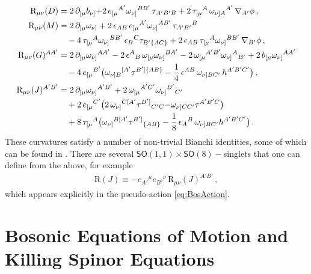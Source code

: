 \documentclass[a4paper,10pt,openany]{article}
\def\rmR{\mathrm{R}}
\begin{document}
	\begin{subequations}\label{eq:curv2forms}
		\begin{align}
			\rmR_{\mu\nu}(D)         &=
			2\,\partial_{[\mu}b_{\nu]} {+ 2\,e_{[\mu}{}^{A'}\omega_{\nu]}{}^{BB'}}\,\tau_{A'B'B} + 2\,\tau_{[\mu}{}^A\,\omega_{\nu]A}{}^{A'}\,\nabla _{A'}\phi\,,\\
			\rmR_{\mu\nu}(M)         &=
			2\,\partial_{[\mu}\omega_{\nu]}+ 2\,\epsilon_{AB}\,e_{[\mu}{}^{A'}\omega_{\nu]}{}^{AB'}\,\tau_{A'B'}{}^{B}\notag\\
			&\quad - 4\,\tau_{[\mu}{}^A\omega_{\nu]}{}^{BB'}\,\epsilon_B{}^C\tau_{B'\{AC\}} + 2\,\epsilon_{AB}\,\tau_{[\mu}{}^A\omega_{\nu]}{}^{BB'}\,\nabla _{B'}\phi\,,\\
			\rmR_{\mu\nu}(G)^{AA'}   &=
			2\,\partial_{[\mu}\omega_{\nu]}{}^{AA'}-2\,\epsilon^A{}_B\,\omega_{[\mu}{}\omega_{\nu]}{}^{BA'} - 2\,\omega_{[\mu}{}^{A'B'}\omega_{\nu]}{}^A{}_{B'} + 2\,b_{[\mu}{} \omega_{\nu]}{}^{AA'}\notag\\
			&\quad - 4\,e_{[\mu}{}^{B'}\big(\omega_{\nu]B}{}^{[A'}\tau^{B']\{AB\}} -\frac14\,\epsilon^{AB}\,\omega_{\nu]BC'}\,h^{A'B'C'}\big) \,,\\
			\rmR_{\mu\nu}(J)^{A'B'}  &=
			2\,\partial_{[\mu}\omega_{\nu]}{}^{A'B'} + 2\,\omega_{[\mu}{}^{A'C'}\omega_{\nu]}{}^{B'}{}_{C'}\notag\\
			&\quad +2\,e_{[\mu}{}^{C'}\big( 2\,\omega_{\nu]}{}^{C[A'}\tau^{B']}{}_{C'C}{-\omega_{\nu]CC'}\tau^{A'B'C}}\big) \notag\\
			&\quad+8\,\tau_{[\mu}{}^A\big(\omega_{\nu]}{}^{B[A'}\tau^{B']}{}_{\{AB\}}-\frac18\,\epsilon_{A}{}^B\,\omega_{\nu]BC'}h^{A'B'C'}\big)\,.
		\end{align}
	\end{subequations}
	These curvatures satisfy a number of non-trivial Bianchi identities, some of which can be found in \cite{Bergshoeff:2021bmc}. There are several $\mathsf{SO}(1,1)\times\mathsf{SO}(8)-$singlets that one can define from the above, for example
	\begin{align}\label{eq:RJ}
		\rmR(J) \equiv -e_{A'}{}^\mu e_{B'}{}^\nu\,\rmR_{\mu\nu}(J)^{A'B'}\,,
	\end{align}
	which appears explicitly in the pseudo-action \eqref{eq:BosAction}.
	
	
	\section{Bosonic Equations of Motion and Killing Spinor Equations}
	
\end{document}
